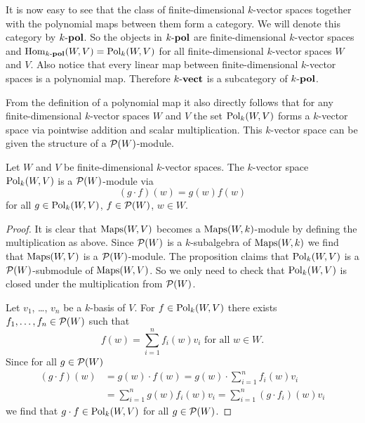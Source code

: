 It is now easy to see that the class of finite-dimensional $k$-vector spaces together with the polynomial maps between them form a category.
We will denote this category by $k\text{-}\mathbf{pol}$.
So the objects in $k\text{-}\mathbf{pol}$ are finite-dimensional $k$-vector spaces and $\operatorname{Hom}_{k\text{-}\mathbf{pol}}(W,V) = \operatorname{Pol}_k(W,V)$ for all finite-dimensional $k$-vector spaces $W$ and $V$.
Also notice that every linear map between finite-dimensional $k$-vector spaces is a polynomial map.
Therefore $k\text{-}\mathbf{vect}$ is a subcategory of $k\text{-}\mathbf{pol}$.

From the definition of a polynomial map it also directly follows that for any finite-dimensional $k$-vector spaces $W$ and $V$ the set $\operatorname{Pol}_k(W,V)$ forms a $k$-vector space via pointwise addition and scalar multiplication.
This $k$-vector space can be given the structure of a $\mathcal{P}(W)$-module.

\begin{prop}
  Let $W$ and $V$ be finite-dimensional $k$-vector spaces.
  The $k$-vector space $\operatorname{Pol}_k(W,V)$ is a $\mathcal{P}(W)$-module via
  \[
      (g \cdot f)(w)
    = g(w) f(w)
  \]
  for all $g \in \operatorname{Pol}_k(W,V)$,
  $f \in \mathcal{P}(W)$,
  $w \in W$.
\end{prop}
\begin{proof}
  It is clear that $\operatorname{Maps}(W,V)$ becomes a $\operatorname{Maps}(W,k)$-module by defining the multiplication as above.
  Since $\mathcal{P}(W)$ is a $k$-subalgebra of $\operatorname{Maps}(W,k)$ we find that $\operatorname{Maps}(W,V)$ is a $\mathcal{P}(W)$-module.
  The proposition claims that $\operatorname{Pol}_k(W,V)$ is a $\mathcal{P}(W)$-submodule of $\operatorname{Maps}(W,V)$.
  So we only need to check that $\operatorname{Pol}_k(W,V)$ is closed under the multiplication from $\mathcal{P}(W)$.
  
  Let $v_1$, \dots, $v_n$ be a $k$-basis of $V$.
  For $f \in \operatorname{Pol}_k(W,V)$ there exists $f_1, \dotsc, f_n \in \mathcal{P}(W)$ such that
  \[
      f(w)
    = \sum_{i=1}^n f_i(w) v_i
    \text{ for all }
    w \in W.
  \]
  Since for all $g \in \mathcal{P}(W)$
  \begin{align*}
        (g \cdot f)(w)
    &=  g(w) \cdot f(w)
     =  g(w) \cdot \sum_{i=1}^n f_i(w) v_i \\
    &=  \sum_{i=1}^n g(w) f_i(w) v_i
     =  \sum_{i=1}^n (g \cdot f_i)(w) v_i
  \end{align*}
  we find that $g \cdot f \in \operatorname{Pol}_k(W,V)$ for all $g \in \mathcal{P}(W)$.
\end{proof}



